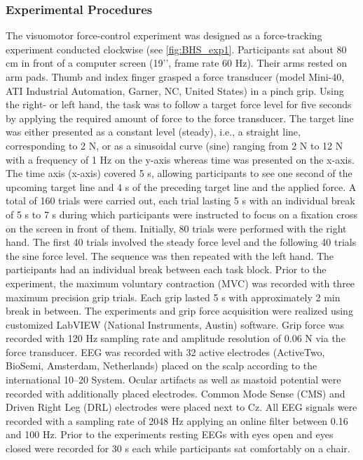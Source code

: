 \subsubsection{Experimental Procedures}
The visuomotor force-control experiment was designed as a force-tracking experiment conducted clockwise (see \autoref{fig:BHS_exp1}. Participants sat about 80 cm in front of a computer screen (19’’, frame rate 60 Hz). Their arms rested on arm pads. Thumb and index finger grasped a force transducer (model Mini-40, ATI Industrial Automation, Garner, NC, United States) in a pinch grip. Using the right- or left hand, the task was to follow a target force level for five seconds by applying the required amount of force to the force transducer. The target line was either presented as a constant level (steady), i.e., a straight line, corresponding to 2 N, or as a sinusoidal curve (sine) ranging from 2 N to 12 N with a frequency of 1 Hz on the y-axis whereas time was presented on the x-axis. The time axis (x-axis) covered 5 s, allowing participants to see one second of the upcoming target line and 4 s of the preceding target line and the applied force. A total of 160 trials were carried out, each trial lasting 5 s with an individual break of 5 s to 7 s during which participants were instructed to focus on a fixation cross on the screen in front of them. Initially, 80 trials were performed with the right hand. The first 40 trials involved the steady force level and the following 40 trials the sine force level. The sequence was then repeated with the left hand. The participants had an individual break between each task block. Prior to the experiment, the maximum voluntary contraction (MVC) was recorded with three maximum precision grip trials. Each grip lasted 5 s with approximately 2 min break in between. The experiments and grip force acquisition were realized using customized LabVIEW (National Instruments, Austin) software. Grip force was recorded with 120 Hz sampling rate and amplitude resolution of 0.06 N via the force transducer. EEG was recorded with 32 active electrodes (ActiveTwo, BioSemi, Amsterdam, Netherlands) placed on the scalp according to the international 10–20 System. Ocular artifacts as well as mastoid potential were recorded with additionally placed electrodes. Common Mode Sense (CMS) and Driven Right Leg (DRL) electrodes were placed next to Cz. All EEG signals were recorded with a sampling rate of 2048 Hz applying an online filter between 0.16 and 100 Hz. Prior to the experiments resting EEGs with eyes open and eyes closed were recorded for 30 s each while participants sat comfortably on a chair.

